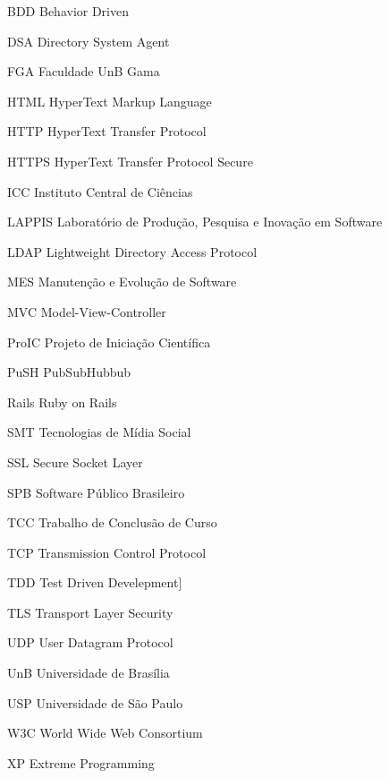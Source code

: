 \begin{siglas}
  \item[BDD] Behavior Driven 
  \item[DSA] Directory System Agent
  \item[FGA] Faculdade UnB Gama
  \item[HTML] HyperText Markup Language
  \item[HTTP] HyperText Transfer Protocol
  \item[HTTPS] HyperText Transfer Protocol Secure
  \item[ICC] Instituto Central de Ciências
  \item[LAPPIS] Laboratório de Produção, Pesquisa e Inovação em Software
  \item[LDAP] Lightweight Directory Access Protocol
  \item[MES] Manutenção e Evolução de Software
  \item[MVC] Model-View-Controller
  \item[ProIC] Projeto de Iniciação Científica
  \item[PuSH] PubSubHubbub
  \item[Rails] Ruby on Rails
  \item[SMT] Tecnologias de Mídia Social
  \item[SSL] Secure Socket Layer
  \item[SPB] Software Público Brasileiro
  \item[TCC] Trabalho de Conclusão de Curso
  \item[TCP] Transmission Control Protocol
  \item[TDD] Test Driven Develepment]
  \item[TLS] Transport Layer Security
  \item[UDP] User Datagram Protocol
  \item[UnB] Universidade de Brasília
  \item[USP] Universidade de São Paulo
  \item[W3C] World Wide Web Consortium
  \item[XP] Extreme Programming
\end{siglas}
